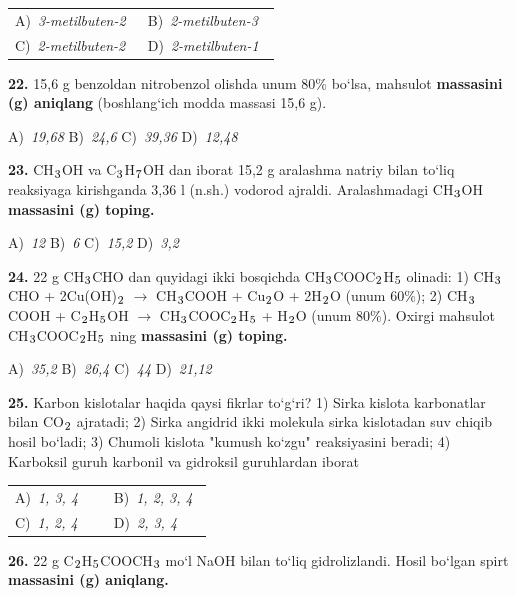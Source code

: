 \documentclass[11pt,a4paper]{article}
\renewcommand{\textsubscript}[1]{\ensuremath{_{\text{\fontsize{8}{8}\selectfont #1}}}}
\begin{document}
\begin{multicols}{2}
\noindent\begin{tabular}{@{}p{0.47\linewidth}@{}p{0.47\linewidth}@{}}
A)~\textsl{3-metilbuten-2} & B)~\textsl{2-metilbuten-3} \\
C)~\textsl{2-metilbuten-2} & D)~\textsl{2-metilbuten-1} \\
\end{tabular}\par
\vspace{4pt}
\noindent\textbf{22.} 15,6 g benzoldan nitrobenzol olishda unum 80\% bo`lsa, mahsulot \textbf{massasini (g) aniqlang} (boshlang`ich modda massasi 15,6 g).

\noindent A)~\textsl{19,68} \hfill B)~\textsl{24,6} \hfill C)~\textsl{39,36} \hfill D)~\textsl{12,48}\par
\vspace{4pt}
\noindent\textbf{23.} CH\textsubscript{3}OH va C\textsubscript{3}H\textsubscript{7}OH dan iborat 15,2 g aralashma natriy bilan to`liq reaksiyaga kirishganda 3,36 l (n.sh.) vodorod ajraldi. Aralashmadagi CH\textsubscript{3}OH \textbf{massasini (g) toping.}

\noindent A)~\textsl{12} \hfill B)~\textsl{6} \hfill C)~\textsl{15,2} \hfill D)~\textsl{3,2}\par
\vspace{4pt}
\noindent\textbf{24.} 22 g CH\textsubscript{3}CHO dan quyidagi ikki bosqichda CH\textsubscript{3}COOC\textsubscript{2}H\textsubscript{5} olinadi: 1) CH\textsubscript{3}CHO + 2Cu(OH)\textsubscript{2} $\to$ CH\textsubscript{3}COOH + Cu\textsubscript{2}O + 2H\textsubscript{2}O (unum 60\%); 2) CH\textsubscript{3}COOH + C\textsubscript{2}H\textsubscript{5}OH $\to$ CH\textsubscript{3}COOC\textsubscript{2}H\textsubscript{5} + H\textsubscript{2}O (unum 80\%). Oxirgi mahsulot CH\textsubscript{3}COOC\textsubscript{2}H\textsubscript{5} ning \textbf{massasini (g) toping.}

\noindent A)~\textsl{35,2} \hfill B)~\textsl{26,4} \hfill C)~\textsl{44} \hfill D)~\textsl{21,12}\par
\vspace{4pt}
\noindent\textbf{25.} Karbon kislotalar haqida qaysi fikrlar to`g`ri? 1) Sirka kislota karbonatlar bilan CO\textsubscript{2} ajratadi; 2) Sirka angidrid ikki molekula sirka kislotadan suv chiqib hosil bo`ladi; 3) Chumoli kislota "kumush ko`zgu" reaksiyasini beradi; 4) Karboksil guruh karbonil va gidroksil guruhlardan iborat

\noindent\begin{tabular}{@{}p{0.47\linewidth}@{}p{0.47\linewidth}@{}}
A)~\textsl{1, 3, 4} & B)~\textsl{1, 2, 3, 4} \\
C)~\textsl{1, 2, 4} & D)~\textsl{2, 3, 4} \\
\end{tabular}\par
\vspace{4pt}
\noindent\textbf{26.} 22 g C\textsubscript{2}H\textsubscript{5}COOCH\textsubscript{3} mo`l NaOH bilan to`liq gidrolizlandi. Hosil bo`lgan spirt \textbf{massasini (g) aniqlang.}


\end{multicols}
\end{document}
